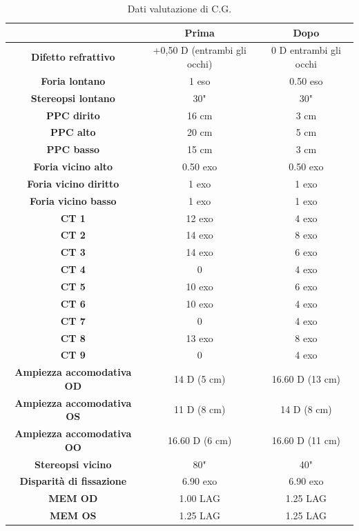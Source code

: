 \begin{table}[H]
\begin{center}
\begin{tabular}{|c|c|c|} \hline
{\textbf{}} & {\textbf{Prima}} & {\textbf{Dopo}}\\ \hline
\textbf{Difetto refrattivo} & +0,50 D (entrambi gli occhi) & 0 D entrambi gli occhi \\ \hline
\textbf{Foria lontano} & 1 eso & 0.50 eso \\ \hline
\textbf{Stereopsi lontano} & 30" & 30" \\ \hline
\textbf{PPC dirito} & 16 cm & 3 cm \\ \hline
\textbf{PPC alto} & 20 cm & 5 cm \\ \hline
\textbf{PPC basso} & 15 cm & 3 cm\\ \hline
\textbf{Foria vicino alto} & 0.50 exo & 0.50 exo \\ \hline
\textbf{Foria vicino diritto} & 1 exo & 1 exo \\ \hline
\textbf{Foria vicino basso} & 1 exo & 1 exo \\ \hline
\textbf{CT 1} & 12 exo & 4 exo \\ \hline
\textbf{CT 2} & 14 exo & 8 exo \\ \hline
\textbf{CT 3} & 14 exo & 6 exo \\ \hline
\textbf{CT 4} & 0 & 4 exo \\ \hline
\textbf{CT 5} & 10 exo & 6 exo \\ \hline
\textbf{CT 6} & 10 exo & 4 exo \\ \hline
\textbf{CT 7} & 0 & 4 exo \\ \hline
\textbf{CT 8} & 13 exo & 8 exo \\ \hline
\textbf{CT 9} & 0 & 4 exo \\ \hline
\textbf{Ampiezza accomodativa OD} & 14 D (5 cm) & 16.60 D (13 cm)\\ \hline
\textbf{Ampiezza accomodativa OS} & 11 D (8 cm) & 14 D (8 cm)\\ \hline
\textbf{Ampiezza accomodativa OO} & 16.60 D (6 cm) & 16.60 D (11 cm) \\ \hline
\textbf{Stereopsi vicino} & 80" & 40" \\ \hline
\textbf{Disparità di fissazione} & 6.90 exo & 6.90 exo\\ \hline
\textbf{MEM OD} & 1.00 LAG  & 1.25 LAG \\ \hline
\textbf{MEM OS} & 1.25 LAG & 1.25 LAG\\ \hline

\hline
\end{tabular}
\end{center}
\caption{Dati valutazione di C.G.}
\end{table}

